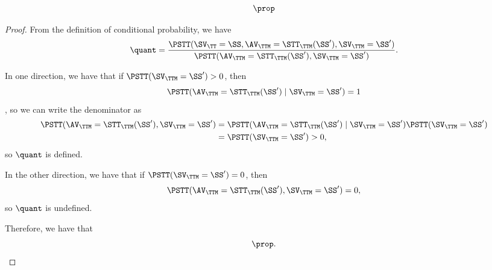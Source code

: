\begin{proposition}
  $$\prop$$%
\end{proposition}

\begin{proof}
  From the definition of conditional probability, we have
  $$ \quant 
  = \frac{\PSTT(\SV_\TT = \SS, \AV_\TTM = \STT_\TTM(\SS'), \SV_\TTM = \SS')}
    {\PSTT(\AV_\TTM = \STT_\TTM(\SS'), \SV_\TTM = \SS')}.$$

  In one direction, we have that if $\PSTT(\SV_\TTM = \SS') > 0$, then 
  $$\PSTT(\AV_\TTM = \STT_\TTM(\SS')\mid \SV_\TTM = \SS') = 1$$ 
  , so
  we can write the denominator as
  \begin{align*}
    \PSTT(\AV_\TTM = \STT_\TTM(\SS'), \SV_\TTM = \SS') &= \PSTT(\AV_\TTM = \STT_\TTM(\SS')\mid \SV_\TTM = \SS')
    \PSTT(\SV_\TTM = \SS')\\
                                                     &= \PSTT(\SV_\TTM = \SS') > 0,
  \end{align*}
  so $\quant$ is defined.

  In the other direction, we have that if $\PSTT(\SV_\TTM = \SS') = 0$, then 
  $$ \PSTT(\AV_\TTM = \STT_\TTM(\SS'), \SV_\TTM = \SS') = 0,$$ 
  so $\quant$
  is undefined.

  Therefore, we have that
  $$\prop.$$%
\end{proof}
